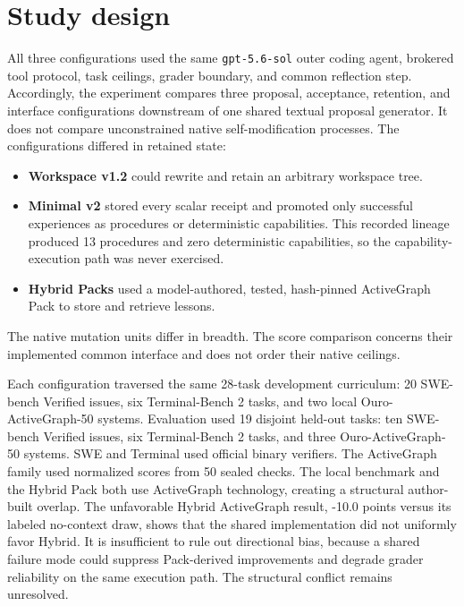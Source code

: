 \documentclass[10pt,twocolumn]{article}
\providecommand{\tightlist}{\setlength{\itemsep}{0pt}\setlength{\parskip}{0pt}}
\begin{document}
\section{Study design}\label{study-design}

All three configurations used the same \texttt{gpt-5.6-sol} outer coding
agent, brokered tool protocol, task ceilings, grader boundary, and
common reflection step. Accordingly, the experiment compares three
proposal, acceptance, retention, and interface configurations downstream
of one shared textual proposal generator. It does not compare
unconstrained native self-modification processes. The configurations
differed in retained state:

\begin{itemize}
\tightlist
\item
  \textbf{Workspace v1.2} could rewrite and retain an arbitrary
  workspace tree.
\item
  \textbf{Minimal v2} stored every scalar receipt and promoted only
  successful experiences as procedures or deterministic capabilities.
  This recorded lineage produced 13 procedures and zero deterministic
  capabilities, so the capability-execution path was never exercised.
\item
  \textbf{Hybrid Packs} used a model-authored, tested, hash-pinned
  ActiveGraph Pack to store and retrieve lessons.
\end{itemize}

The native mutation units differ in breadth. The score comparison
concerns their implemented common interface and does not order their
native ceilings.

Each configuration traversed the same 28-task development curriculum: 20
SWE-bench Verified issues, six Terminal-Bench 2 tasks, and two local
Ouro-ActiveGraph-50 systems. Evaluation used 19 disjoint held-out tasks:
ten SWE-bench Verified issues, six Terminal-Bench 2 tasks, and three
Ouro-ActiveGraph-50 systems. SWE and Terminal used official binary
verifiers. The ActiveGraph family used normalized scores from 50 sealed
checks. The local benchmark and the Hybrid Pack both use ActiveGraph
technology, creating a structural author-built overlap. The unfavorable
Hybrid ActiveGraph result, -10.0 points versus its labeled no-context
draw, shows that the shared implementation did not uniformly favor
Hybrid. It is insufficient to rule out directional bias, because a
shared failure mode could suppress Pack-derived improvements and degrade
grader reliability on the same execution path. The structural conflict
remains unresolved.
\end{document}

